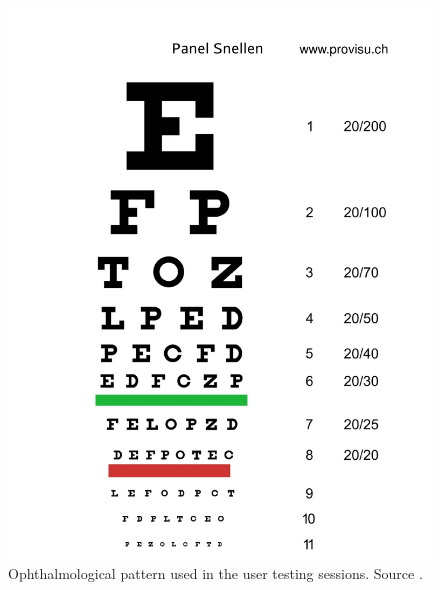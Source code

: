 \documentclass[10pt,a4paper,twocolumn,twoside]{article}
\begin{document}
	\begin{figure}[b]
		\centering
		\includegraphics[width=1\linewidth]{img/Snellenchart_es-1.jpg}
		\caption{Ophthalmological pattern used in the user testing sessions. Source \cite{web:snellen}.}
		\label{fig:add:pattern}
	\end{figure}
\end{document}
